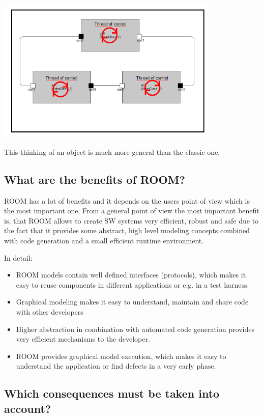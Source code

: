 \includegraphics[width=0.8\textwidth]{images/010-RoomIntroduction03.png}

This thinking of an object is much more general than the classic one.  

\subsection{What are the benefits of ROOM?}

ROOM has a lot of benefits and it depends on the users point of view which is the most important one. From a general point of view the most important benefit is, that ROOM allows to create SW systems very efficient, robust and safe due to the fact that it provides some abstract, high level modeling concepts combined with code generation and a small efficient runtime environment.  

In detail:
\begin{itemize}
\item ROOM models contain well defined interfaces (protocols), which makes it easy to reuse components in different applications or e.g. in a test harness. 
\item Graphical modeling makes it easy to understand, maintain and share code with other developers
\item Higher abstraction in combination with automated code generation provides very efficient mechanisms to the developer. 
\item ROOM provides graphical model execution, which makes it easy to understand the application or find defects in a very early phase. 
\end{itemize}

\subsection{Which consequences must be taken into account?}

